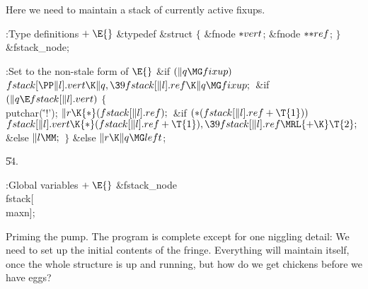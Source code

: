 Here we need to maintain a stack of currently active fixups.

\Y\B\4:Type definitions\X${}\mathrel+\E{}$\6
\&{typedef} \&{struct} ${}\{{}$\1\6
\&{fnode} ${}{*}\\{vert}{}$;\6
\&{fnode} ${}{*}{*}\\{ref}{}$;\2\6
${}\}{}$ \&{fstack\_node};\par
\fi

\B{}:Set  to the non-stale form of \X${}%
\E{}$\6
\&{if} ${}(\|q\MG\\{fixup}){}$\1\5
${}\\{fstack}[\PP\|l].\\{vert}\K\|q,\39\\{fstack}[\|l].\\{ref}\K\|q\MG%
\\{fixup};{}$\2\6
\&{if} ${}(\|q\E\\{fstack}[\|l].\\{vert}){}$\5
${}\{{}$\1\6
\\{putchar}(\.{'!'});\6
${}\|r\K{*}(\\{fstack}[\|l].\\{ref});{}$\6
\&{if} ${}({*}(\\{fstack}[\|l].\\{ref}+\T{1})){}$\1\5
${}\\{fstack}[\|l].\\{vert}\K{*}(\\{fstack}[\|l].\\{ref}+\T{1}),\39\\{fstack}[%
\|l].\\{ref}\MRL{+{\K}}\T{2};{}$\2\6
\&{else}\1\5
${}\|l\MM;{}$\2\6
\4${}\}{}$\5
\2\&{else}\1\5
${}\|r\K\|q\MG\\{left}{}$;\2\par
\U54.\fi

\B{}:Global variables\X${}\mathrel+\E{}$\6
\&{fstack\_node} \\{fstack}[\\{maxn}];\par
\fi

Priming the pump. The program is complete except for one niggling
detail: We need to set up the initial contents of the fringe.
Everything will maintain itself, once the whole structure is up and running,
but how do we get chickens before we have eggs?

